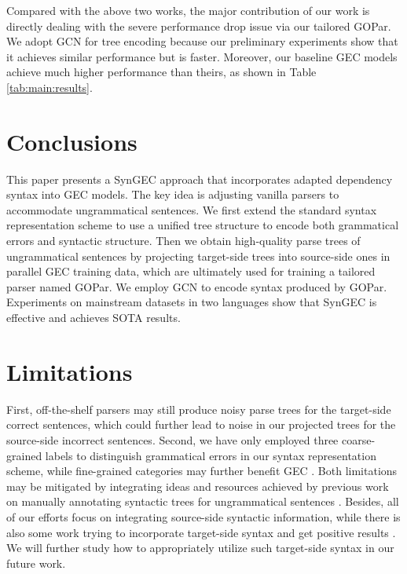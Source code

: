 \documentclass[11pt]{article}
\begin{document}
Compared with the above two works, the major contribution of our work is directly dealing with the severe performance drop issue via our tailored GOPar. 
We adopt GCN for tree encoding because our preliminary experiments show that it achieves similar performance but is faster. 
Moreover, our baseline GEC models achieve much higher performance than theirs, as shown in Table \ref{tab:main:results}.



 
\section{Conclusions}

This paper presents a SynGEC approach that incorporates adapted dependency syntax into GEC models. The key idea is adjusting vanilla parsers to accommodate ungrammatical sentences. We first extend the standard syntax representation scheme to use a unified tree structure to encode both grammatical errors and syntactic structure. Then we obtain high-quality parse trees of ungrammatical sentences by projecting target-side trees into source-side ones in parallel GEC training data, which are ultimately used for training a tailored parser named GOPar.
We employ GCN to encode syntax produced by GOPar. Experiments on mainstream datasets in two languages show that SynGEC is effective and achieves SOTA results.


\section*{Limitations}
First, off-the-shelf parsers may still produce noisy parse trees for the target-side correct sentences, which could further lead to noise in our projected trees for the source-side incorrect sentences. Second, we have only employed three coarse-grained labels to distinguish grammatical errors in our syntax representation scheme, while fine-grained categories may further benefit GEC \citep{DBLP:conf/emnlp/YuanTD021}. Both limitations may be mitigated by integrating ideas and resources achieved by previous work on manually annotating syntactic trees for ungrammatical sentences \citep{dickinson2009dependency,DBLP:conf/acl/BerzakKSWLMGK16}. Besides, all of our efforts focus on integrating source-side syntactic information, while there is also some work trying to incorporate target-side syntax and get positive results \citep{aharoni2017towards,wang2018tree}. We will further study how to appropriately utilize such target-side syntax in our future work. 
\end{document}
